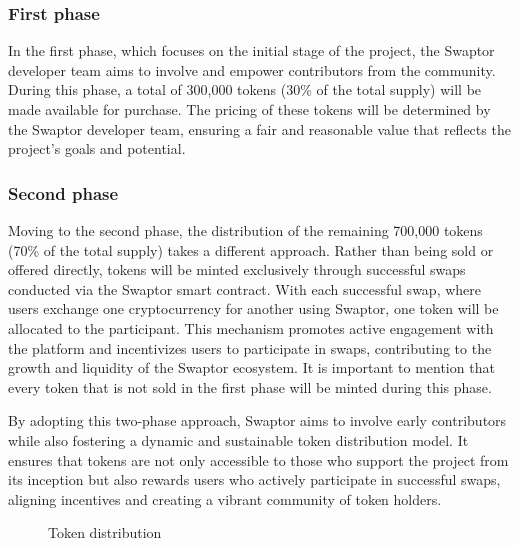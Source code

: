 \documentclass[12pt]{article}
\begin{document}
\subsubsection{First phase}
In the first phase, which focuses on the initial stage of the project, the Swaptor developer team aims to involve
and empower contributors from the community. During this phase, a total of 300,000 tokens
(30\% of the total supply) will be made available for purchase.
The pricing of these tokens will be determined by the Swaptor developer team, ensuring a fair and reasonable value
that reflects the project's goals and potential.

\subsubsection{Second phase}
Moving to the second phase, the distribution of the remaining 700,000 tokens
(70\% of the total supply) takes a different approach. Rather than being sold or offered directly,
tokens will be minted exclusively through successful swaps conducted via the Swaptor smart contract.
With each successful swap, where users exchange one cryptocurrency for another using Swaptor,
one token will be allocated to the participant. This mechanism promotes active engagement with the platform
and incentivizes users to participate in swaps, contributing to the growth and liquidity of the Swaptor ecosystem.
It is important to mention that every token that is not sold in the first phase will be minted during this phase.

\vspace{1.5cc}
By adopting this two-phase approach, Swaptor aims to involve early contributors while also fostering
a dynamic and sustainable token distribution model. It ensures that tokens are not only accessible to
those who support the project from its inception but also rewards users who actively participate in successful swaps,
aligning incentives and creating a vibrant community of token holders.

\vspace{2cc}

\begin{figure}[h]
  \centering
  \caption{Token distribution}
  \label{fig:pie-chart}
\end{figure}


\newpage
\end{document}
